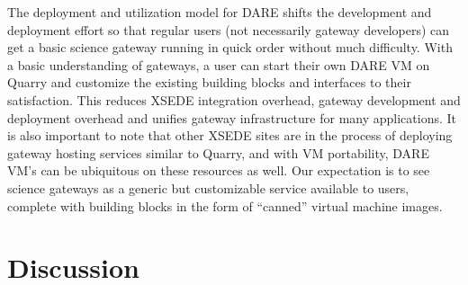 \documentclass[]{svjour3}
\begin{document}
The deployment and utilization model for DARE shifts the development
and deployment effort so that regular users (not necessarily gateway
developers) can get a basic science gateway running in quick order
without much difficulty. With a basic understanding of gateways, a
user can start their own DARE VM on Quarry and customize the existing
building blocks and interfaces to their satisfaction. This reduces
XSEDE integration overhead, gateway development and deployment
overhead and unifies gateway infrastructure for many applications. It
is also important to note that other XSEDE sites are in the process of
deploying gateway hosting services similar to Quarry, and with VM
portability, DARE VM's can be ubiquitous on these resources as
well. Our expectation is to see science gateways as a generic but
customizable service available to users, complete with building blocks
in the form of ``canned'' virtual machine images.




% 
\section{Discussion}
\end{document}
